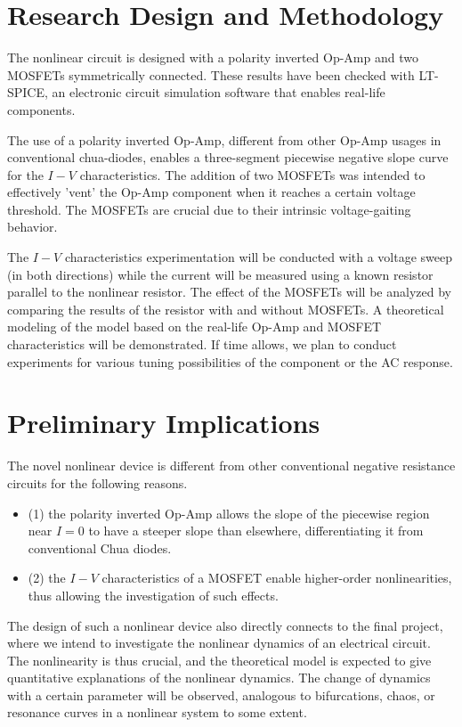 \documentclass[12pt]{article}
\begin{document}
\section{Research Design and Methodology}


The nonlinear circuit is designed with a polarity inverted Op-Amp and two MOSFETs symmetrically connected. These results have been checked with LT-SPICE, an electronic circuit simulation software that enables real-life components.

The use of a polarity inverted Op-Amp, different from other Op-Amp usages in conventional chua-diodes, enables a three-segment piecewise negative slope curve for the \(I-V\) characteristics.  The addition of two MOSFETs was intended to effectively 'vent' the Op-Amp component when it reaches a certain voltage threshold. The MOSFETs are crucial due to their intrinsic voltage-gaiting behavior.

The \(I-V\) characteristics experimentation will be conducted with a voltage sweep (in both directions) while the current will be measured using a known resistor parallel to the nonlinear resistor. The effect of the MOSFETs will be analyzed by comparing the results of the resistor with and without MOSFETs. A theoretical modeling of the model based on the real-life Op-Amp and MOSFET characteristics will be demonstrated. If time allows, we plan to conduct experiments for various tuning possibilities of the component or the AC response. 

\section{Preliminary Implications}


The novel nonlinear device is different from other conventional negative resistance circuits for the following reasons.

\begin{itemize}
    \item (1) the polarity inverted Op-Amp allows the slope of the piecewise region near $I=0$ to have a steeper slope than elsewhere, differentiating it from conventional Chua diodes.
    \item (2) the \(I-V\) characteristics of a MOSFET enable higher-order nonlinearities, thus allowing the investigation of such effects.
\end{itemize}

\noindent The design of such a nonlinear device also directly connects to the final project, where we intend to investigate the nonlinear dynamics of an electrical circuit. The nonlinearity is thus crucial, and the theoretical model is expected to give quantitative explanations of the nonlinear dynamics. The change of dynamics with a certain parameter will be observed, analogous to bifurcations, chaos, or resonance curves in a nonlinear system to some extent.
\end{document}
